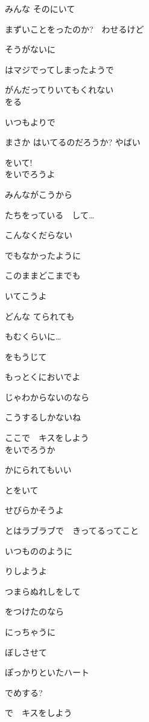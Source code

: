 みんな そのにいて

まずいことをったのか?　わせるけど

そうがないに

はマジでってしまったようで

がんだってりいてもくれない
\\

をる

いつもよりで

まさか はいてるのだろうか? やばい

をいて!
\\

をいでろうよ

みんながこうから

たちをっている　して…

こんなくだらない

でもなかったように

このままどこまでも

いてこうよ

どんな てられても

もむくらいに…

をもうじて

もっとくにおいでよ

じゃわからないのなら

こうするしかないね

ここで　キスをしよう
\\

をいでろうか

かにられてもいい

とをいて

せびらかそうよ

とはラブラブで　きってるってこと

いつもののように

りしようよ

つまらぬれしをして

をつけたのなら

にっちゃうに

ぼしさせて

ぽっかりといたハート

でめする?

で　キスをしよう
\\
